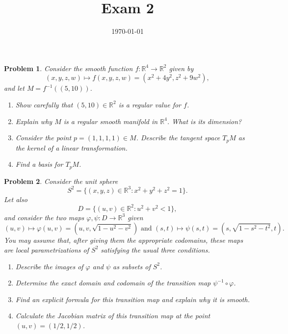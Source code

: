 \documentclass[reqno]{amsart}
\theoremstyle{plain}
\newtheorem{problem}{Problem}
\theoremstyle{definition}
\begin{document}
 

\title[Exam 2]{Exam 2}

\date{\today} 
\maketitle 


\begin{problem}
Consider the smooth function $f:\mathbb{R}^{4} \rightarrow \mathbb{R}^{2}$ given by
$$(x,y,z,w) \mapsto f(x,y,z,w) = (x^{2}+4y^{2},z^{2} + 9w^{2}), $$
and let $M = f^{-1}((5,10))$.
\begin{enumerate}
\item Show carefully that $(5,10) \in \mathbb{R}^{2}$ is a regular value for $f$.
\item Explain why $M$ is a regular smooth manifold in $\mathbb{R}^{4}$.  What is its dimension?
\item Consider the point $p = (1,1,1,1) \in M$.  Describe the tangent space $T_{p}M$ as the kernel of a linear transformation.
\item Find a basis for $T_{p}M$.
\end{enumerate}
\end{problem}

\begin{problem}
Consider the unit sphere
$$S^{2} = \{(x,y,z) \in \mathbb{R}^{3}: x^{2} + y^{2} + z^{2} = 1 \}. $$
Let also 
$$D = \{(u,v) \in \mathbb{R}^{2} : u^{2} + v^{2} < 1 \}, $$
and consider the two maps $\varphi,\psi:D \rightarrow \mathbb{R}^{3}$ given 
$$(u,v) \mapsto \varphi(u,v) = (u,v,\sqrt{1 -u^{2} - v^{2}}) \text{ and } (s,t) \mapsto \psi(s,t) = (s,\sqrt{1-s^{2}-t^{2}},t).$$
You may assume that, after giving them the appropriate codomains, these maps are local parametrizations of $S^{2}$ satisfying the usual three conditions.
\begin{enumerate}
\item Describe the images of $\varphi$ and $\psi$ as subsets of $S^{2}$.
\item Determine the exact domain and codomain of the transition map $\psi^{-1} \circ \varphi$.
\item Find an explicit formula for this transition map and explain why it is smooth.
\item Calculate the Jacobian matrix of this transition map at the point $(u,v) = (1/2,1/2)$.
\end{enumerate}
\end{problem}
\end{document}
